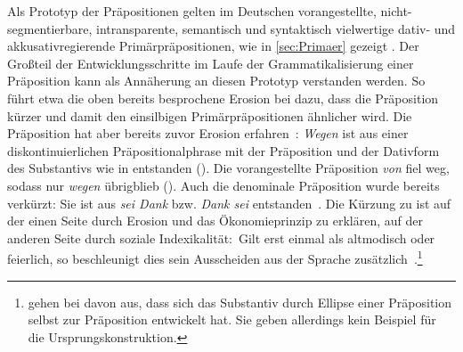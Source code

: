 Als Prototyp der Präpositionen gelten im Deutschen vorangestellte, nicht\hyp segmentierbare, intransparente, semantisch und syntaktisch vielwertige dativ- und akkusativregierende Primärpräpositionen, wie in \autoref{sec:Primaer} gezeigt \citep[s.][42]{Szczepaniak2014}. 
Der Großteil der Entwicklungsschritte im Laufe der Grammatikalisierung einer Präposition kann als Annäherung an diesen Prototyp verstanden werden. 
So führt etwa die oben bereits besprochene Erosion bei  dazu, dass die Präposition kürzer und damit den einsilbigen Primärpräpositionen ähnlicher wird. 
Die Präposition hat aber bereits zuvor Erosion erfahren~\citep[s.][211]{DiMeola2003}: 
\textit{Wegen }ist aus einer diskontinuierlichen Pr{\"a}positionalphrase mit der Präposition  und der Dativform des Substantivs  wie in entstanden (\cites[s.][304]{Braunmueller1985}[50]{Meibauer1995}[98]{Szczepaniak2011}). 
Die vorangestellte Pr{\"a}position \textit{von }fiel weg, sodass nur \textit{wegen }{\"u}brigblieb (\cites[s.][31]{Lehmann1992}[210]{DiMeola2003}). 
Auch die denominale Präposition  wurde bereits verkürzt: 
Sie ist aus \textit{sei Dank }bzw. \textit{Dank sei } entstanden~\citep[s.][65]{Lindqvist1994}.
Die Kürzung zu  ist auf der einen Seite durch Erosion und das {\"O}konomieprinzip zu erklären, auf der anderen Seite durch soziale Indexikalit{\"a}t:~{\glqq}Gilt  erst einmal als altmodisch oder feierlich, so beschleunigt dies sein Ausscheiden aus der Sprache zus{\"a}tzlich{\grqq}~\citep[302]{Lindqvist1994}.\footnote{\citet[2075]{Zifonun1997} gehen bei  davon aus, dass sich das Substantiv durch Ellipse einer Pr{\"a}position selbst zur Pr{\"a}position entwickelt hat. Sie geben allerdings kein Beispiel f{\"u}r die Ursprungskonstruktion.} 


